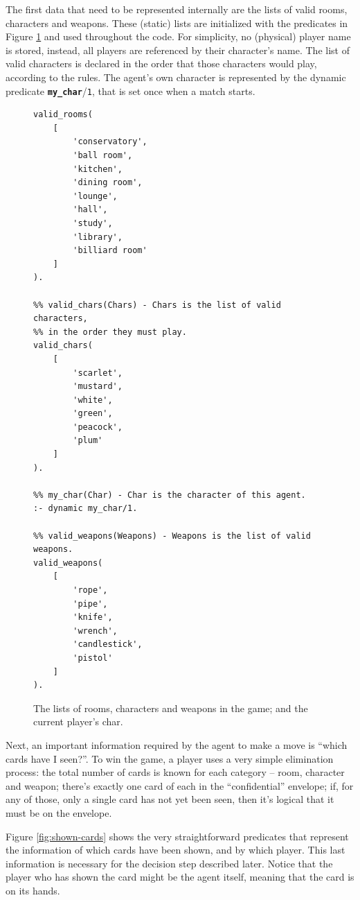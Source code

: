 \documentclass[12pt,a4paper]{article}
\newcommand{\varname}[1]{\texttt{#1}}
\newcommand{\varnamebf}[1]{\textbf{\texttt{#1}}}
\newcommand{\predprot}[2]{{\color{MidnightBlue}\varnamebf{#1}}/{\color{Mulberry}\varname{#2}}}
\begin{document}
The first data that need to be represented internally are the lists of valid rooms, characters and weapons. These (static) lists are initialized with the predicates in Figure \ref{fig:valid-cards} and used throughout the code. For simplicity, no (physical) player name is stored, instead, all players are referenced by their character's name. The list of valid characters is declared in the order that those characters would play, according to the rules. The agent's own character is represented by the dynamic predicate \predprot{my\_char}{1}, that is set once when a match starts.

\begin{figure}[H]
	\centering
\begin{lstlisting}[style=Prolog-pygsty]
%% valid_rooms(Rooms) - Rooms is the list of valid room names.
valid_rooms(
	[
		'conservatory',
		'ball room',
		'kitchen',
		'dining room',
		'lounge',
		'hall',
		'study',
		'library',
		'billiard room'
	]
).

%% valid_chars(Chars) - Chars is the list of valid characters,
%% in the order they must play.
valid_chars(
	[
		'scarlet',
		'mustard',
		'white',
		'green',
		'peacock',
		'plum'
	]
).

%% my_char(Char) - Char is the character of this agent.
:- dynamic my_char/1.

%% valid_weapons(Weapons) - Weapons is the list of valid weapons.
valid_weapons(
	[
		'rope',
		'pipe',
		'knife',
		'wrench',
		'candlestick',
		'pistol'
	]
).
\end{lstlisting}
	\caption{The lists of rooms, characters and weapons in the game; and the current player's char.} 
	\label{fig:valid-cards}
\end{figure}

Next, an important information required by the agent to make a move is ``which cards have I seen?''. To win the game, a player uses a very simple elimination process: the total number of cards is known for each category -- room, character and weapon;  there's exactly one card of each in the ``confidential'' envelope; if, for any of those, only a single card has not yet been seen, then it's logical that it must be on the envelope.

Figure \ref{fig:shown-cards} shows the very straightforward predicates that represent the information of which cards have been shown, and by which player. This last information is necessary for the decision step described later. Notice that the player who has shown the card might be the agent itself, meaning that the card is on its hands.
\end{document}

